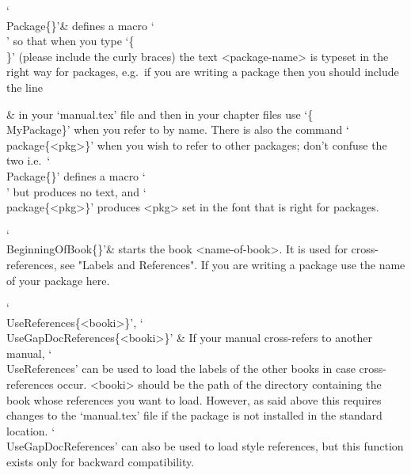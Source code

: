 

\indextt{\\Package}
`\\Package\{<package-name>\}'&
defines   a   macro   `\\<package-name>'   so   that   when   you    type
`\{\\<package-name>\}'  (please  include  the  curly  braces)  the   text
<package-name> is typeset in the right way for {\GAP}  packages,  e.g.~if
you are writing a package  then you should include the
line


  &
in  your  `manual.tex'  file  and  then  in  your   chapter   files   use
`\{\\MyPackage\}' when you refer to  by name. There is
also the command `\\package\{<pkg>\}' when you wish  to  refer  to  other
{\GAP} packages; don't confuse the two i.e.~`\\Package\{<package-name>\}'
defines  a  macro  `\\<package-name>'   but   produces   no   text,   and
`\\package\{<pkg>\}' produces <pkg> set in the font  that  is  right  for
{\GAP} packages.

\indextt{\\BeginningOfBook}
`\\BeginningOfBook\{<name-of-book>\}'&
starts the book <name-of-book>. It  is  used  for  cross-references,  see
"Labels and References". If you are writing a {\GAP} package use the name
of your package here.

\indextt{\\UseReferences}\indextt{\\UseGapDocReferences}
`\\UseReferences\{<booki>\}', `\\UseGapDocReferences\{<booki>\}' &
If your manual cross-refers to another manual, `\\UseReferences'  can  be
used to load the labels of  the  other  books  in  case  cross-references
occur. <booki> should be the path of the directory  containing  the  book
whose references you want to load. However, as said above this requires
changes to the `manual.tex' file if the package is not installed  in  the
standard location. `\\UseGapDocReferences' can also be used to load
 style references, but this function exists only for backward
compatibility.

